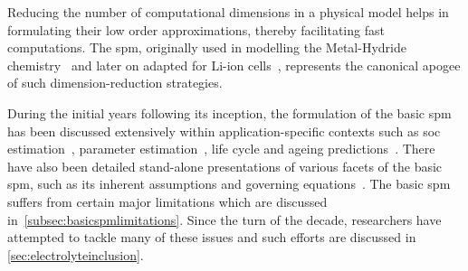 


Reducing  the   number  of   computational  dimensions   in  a   physical  model
helps  in  formulating  their  low order  approximations,  thereby  facilitating
fast   computations.   The  \gls{spm},   originally   used   in  modelling   the
Metal-Hydride    chemistry~\cite{Haran1998}   and    later   on    adapted   for
Li-ion   cells~\cite{Ning2004},  represents   the  canonical   apogee  of   such
dimension-reduction strategies.


During the initial  years following its inception, the formulation  of the basic
\gls{spm} has  been discussed  extensively within  application-specific contexts
such  as  \gls{soc}  estimation~\cite{Santhanagopalan2006a,Santhanagopalan2008},
parameter   estimation~\cite{Santhanagopalan2007},   life   cycle   and   ageing
predictions~\cite{Santhanagopalan2008a,Safari2009}.   There   have   also   been
detailed    stand-alone    presentations    of    various    facets    of    the
basic   \gls{spm},   such   as    its   inherent   assumptions   and   governing
equations~\cite{Santhanagopalan2006,Chaturvedi2010}.    The   basic    \gls{spm}
suffers    from    certain    major     limitations    which    are    discussed
in~\cref{subsec:basicspmlimitations}. Since the turn  of the decade, researchers
have attempted to tackle many of these  issues and such efforts are discussed in
\cref{sec:electrolyteinclusion}.


